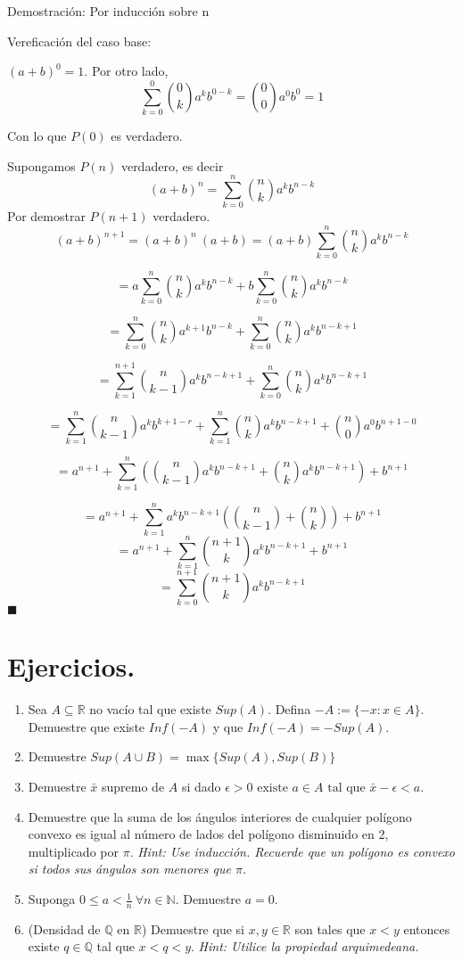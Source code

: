 \documentclass[12pt]{book}
\newcommand\R{{\mathbb R}}
\newcommand\Q{{\mathbb Q}}
\newcommand\N{{\mathbb N}}
\begin{document}
Demostración: Por inducción sobre n

Vereficación del caso base:

$(a+b)^0=1$. Por otro lado, $$\sum_{k=0}^0 \binom{0}{k} a^kb^{0-k}=\binom{0}{0}a^0b^0=1$$

Con lo que $P(0)$ es verdadero.

Supongamos $P(n)$ verdadero, es decir $$(a+b)^n=\sum_{k=0}^n \binom{n}{k} a^kb^{n-k}$$
Por demostrar $P(n+1)$ verdadero.
$$(a+b)^{n+1}=(a+b)^n \ (a+b)=(a+b) \sum_{k=0}^n \binom{n}{k} a^kb^{n-k}$$

$$=a\sum_{k=0}^n \binom{n}{k} a^kb^{n-k}+b\sum_{k=0}^n \binom{n}{k} a^kb^{n-k}$$

$$=\sum_{k=0}^n \binom{n}{k} a^{k+1}b^{n-k}+\sum_{k=0}^n \binom{n}{k} a^kb^{n-k+1}$$

$$=\sum_{k=1}^{n+1} \binom{n}{k-1} a^kb^{n-k+1}+\sum_{k=0}^n \binom{n}{k} a^kb^{n-k+1}$$

$$=\sum_{k=1}^n \binom{n}{k-1} a^kb^{k+1-r}+\sum_{k=1}^n \binom{n}{k} a^kb^{n-k+1}+\binom{n}{0}a^0b^{n+1-0}$$

$$=a^{n+1}+\sum_{k=1}^n(\binom{n}{k-1} a^kb^{n-k+1}+\binom{n}{k} a^kb^{n-k+1})+b^{n+1}$$

$$=a^{n+1}+\sum_{k=1}^n a^kb^{n-k+1}(\binom{n}{k-1}+\binom{n}{k})+b^{n+1}$$
$$=a^{n+1}+\sum_{k=1}^n \binom{n+1}{k}a^kb^{n-k+1}+b^{n+1}$$
$$=\sum_{k=0}^{n+1} \binom{n+1}{k}a^kb^{n-k+1}$$ $\blacksquare$
\clearpage
\section{Ejercicios.}
\begin{enumerate}
    \item Sea $A \subseteq \R$ no vacío tal que existe $Sup(A)$. Defina $-A:=\{-x : x\in A \}$. Demuestre que existe $Inf(-A)$ y que $Inf(-A)=-Sup(A)$.
    \item Demuestre $Sup(A \cup B)=\max \{ Sup(A),Sup(B) \}$
    \item Demuestre $\bar{x}$ supremo de  $A$ si dado $\epsilon >0 \mbox{ existe } a\in A \mbox{ tal que } \bar{x}-\epsilon < a$.
    \item Demuestre que la suma de los ángulos interiores de cualquier polígono convexo es igual al número de lados del polígono disminuido en 2, multiplicado por $\pi$. \textit{Hint: Use inducción. Recuerde que un polígono es convexo si todos sus ángulos son menores que $\pi$.}
    \item Suponga $0 \le a < \frac{1}{n} \ \forall{n \in \N}$. Demuestre $a=0$.
    \item (Densidad de $\Q$ en $\R$) Demuestre que si $x,y \in \R$ son tales que $x<y$ entonces existe $q \in \Q$ tal que $x<q<y$. \textit{Hint: Utilice la propiedad arquimedeana.}
\end{enumerate}
\end{document}
